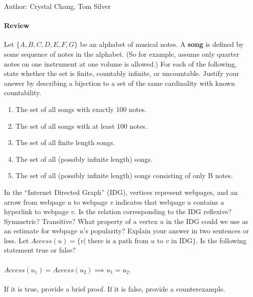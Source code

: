 \documentclass[solution, letterpaper]{cs20inclass}
\begin{document}

\noindent Author: Crystal Chang, Tom Silver%

\paragraph*{Review}

\problem
Let $\{A, B, C, D, E, F, G\}$ be an alphabet of musical notes. A \textbf{song} is defined by some sequence of notes in the alphabet. (So for example, assume only quarter notes on one instrument at one volume is allowed.) For each of the following, state whether the set is finite, countably infinite, or uncountable. Justify your answer by describing a bijection to a set of the same cardinality with known countability.

\begin{enumerate}

\item The set of all songs with exactly 100 notes.
\item The set of all songs with at least 100 notes.
\item The set of all finite length songs.
\item The set of all (possibly infinite length) songs.
\item The set of all (possibly infinite length) songs consisting of only B notes.

\end{enumerate}

\begin{solution}
\end{solution}

\problem
In the ``Internet Directed Graph'' (IDG), vertices represent webpages, and an arrow from webpage $u$ to webpage $v$ indicates that webpage $u$ contains a hyperlink to webpage $v$. 
\subproblem Is the relation corresponding to the IDG reflexive? Symmetric? Transitive? 
\subproblem What property of a vertex $u$ in the IDG could we use as an estimate for webpage $u$'s popularity? Explain your answer in two sentences or less.
\subproblem Let $Access(u) = \{ v | \text{ there is a path from } u \text{ to } v \text{ in IDG}\}$. Is the following statement true or false? 
\\
\\$Access(u_1) = Access(u_2) \implies u_1 = u_2$. 
\\
\\ If it is true, provide a brief proof. If it is false, provide a counterexample.
\end{document}
